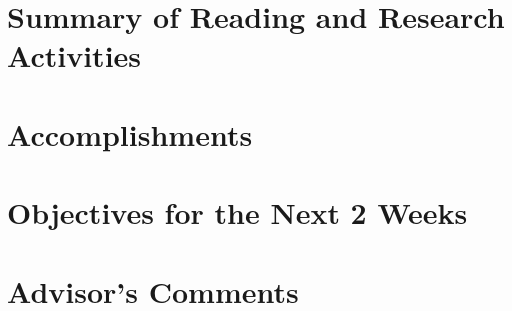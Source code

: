 \documentclass[11pt]{report}
\begin{document}
\section{Summary of Reading and Research Activities}

\section{Accomplishments}

\section{Objectives for the Next 2 Weeks}

\section{Advisor's Comments}

%



\end{document}
